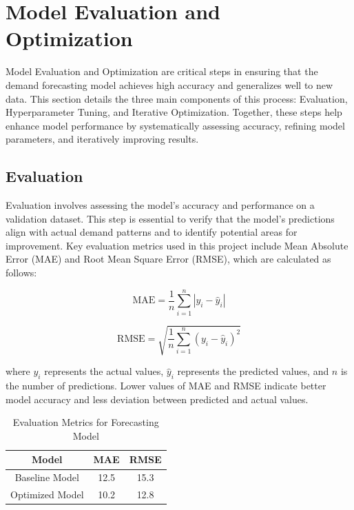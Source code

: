 \section{Model Evaluation and Optimization}

Model Evaluation and Optimization are critical steps in ensuring that the demand forecasting model achieves high accuracy and generalizes well to new data. This section details the three main components of this process: Evaluation, Hyperparameter Tuning, and Iterative Optimization. Together, these steps help enhance model performance by systematically assessing accuracy, refining model parameters, and iteratively improving results.

\subsection{Evaluation}

Evaluation involves assessing the model's accuracy and performance on a validation dataset. This step is essential to verify that the model’s predictions align with actual demand patterns and to identify potential areas for improvement. Key evaluation metrics used in this project include Mean Absolute Error (MAE) and Root Mean Square Error (RMSE), which are calculated as follows:

\begin{equation}
    \text{MAE} = \frac{1}{n} \sum_{i=1}^{n} |y_i - \hat{y}_i|
\end{equation}

\begin{equation}
    \text{RMSE} = \sqrt{\frac{1}{n} \sum_{i=1}^{n} (y_i - \hat{y}_i)^2}
\end{equation}

where \( y_i \) represents the actual values, \( \hat{y}_i \) represents the predicted values, and \( n \) is the number of predictions. Lower values of MAE and RMSE indicate better model accuracy and less deviation between predicted and actual values.

\begin{table}[H]
\centering
\caption{Evaluation Metrics for Forecasting Model}
\begin{tabular}{|c|c|c|}
\hline
\textbf{Model} & \textbf{MAE} & \textbf{RMSE} \\ \hline
Baseline Model & 12.5 & 15.3 \\ \hline
Optimized Model & 10.2 & 12.8 \\ \hline
\end{tabular}
\end{table}

